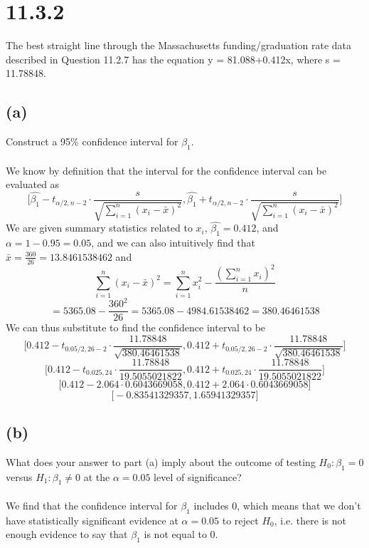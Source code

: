 \documentclass{article}
\begin{document}
{\section*{11.3.2}
The best straight line through the Massachusetts funding/graduation rate data described in Question 11.2.7 has the equation y = 81.088+0.412x, where s = 11.78848.

\subsection*{(a)} 
Construct a 95\% confidence interval for \(\beta_1\).
\\
\\
We know by definition that the interval for the confidence interval can be evaluated as 
\[
\big[ \hat{\beta_1} - t_{\alpha / 2, n - 2} \cdot \frac{s}{\sqrt{\sum_{i=1}^{n}(x_i - \bar{x})^2}}, \hat{\beta_1} + t_{\alpha / 2, n - 2} \cdot \frac{s}{\sqrt{\sum_{i=1}^{n}(x_i - \bar{x})^2}} \big]
\]
We are given summary statistics related to \(x_i\), \(\hat{\beta_1} = 0.412\), and \(\alpha = 1 - 0.95 = 0.05\), and we can also intuitively find that \(\bar{x} = \frac{360}{26} = 13.8461538462\) and 
\[
\sum_{i=1}^{n}(x_i - \bar{x})^2 = \sum_{i=1}^{n}x_i^2 - \frac{(\sum_{i=1}^{n} x_i)^2}{n}
\]
\[
= 5365.08 - \frac{360^2}{26} = 5365.08 - 4984.61538462 = 380.46461538
\]
We can thus substitute to find the confidence interval to be
\[
\big[ 0.412 - t_{0.05 / 2, 26 - 2} \cdot \frac{11.78848}{\sqrt{380.46461538}}, 0.412 + t_{0.05 / 2, 26 - 2} \cdot \frac{11.78848}{\sqrt{380.46461538}} \big]
\]
\[
\big[ 0.412 - t_{0.025, 24} \cdot \frac{11.78848}{19.5055021822}, 0.412 + t_{0.025, 24} \cdot \frac{11.78848}{19.5055021822} \big]
\]
\[
\big[ 0.412 - 2.064 \cdot 0.6043669058, 0.412 + 2.064 \cdot 0.6043669058 \big]
\]
\[
\big[-0.83541329357, 1.65941329357\big]
\]

\subsection*{(b)}
What does your answer to part (a) imply about the outcome of testing \(H_0: \beta_1 = 0\) versus \(H_1: \beta_1 \neq 0\) at the \(\alpha = 0.05\) level of significance?
\\
\\
We find that the confidence interval for \(\beta_1\) includes 0, which means that we don't have statistically significant evidence at \(\alpha = 0.05\) to reject \(H_0\), i.e. there is not enough evidence to say that \(\beta_1\) is not equal to 0.

}
\end{document}
